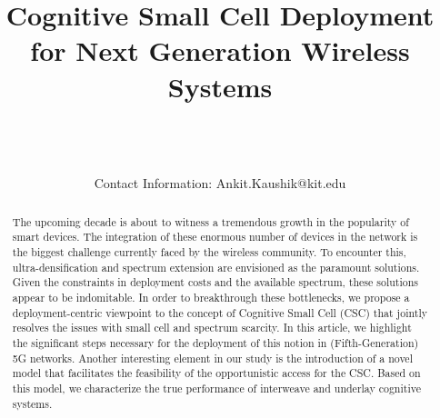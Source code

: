 \documentclass[draftcls, onecolumn, 11pt]{IEEEtran}
\begin{document}
%
\title{Cognitive Small Cell Deployment for Next Generation Wireless Systems}
\author{ \\
 \\ 
 \\ 
Contact Information: Ankit.Kaushik@kit.edu
}


\maketitle
\thispagestyle{empty}
\pagestyle{empty}

\begin{abstract}
The upcoming decade is about to witness a tremendous growth in the popularity of smart devices. 
The integration of these enormous number of devices in the network is the biggest challenge currently faced by the wireless community. To encounter this, ultra-densification and spectrum extension are envisioned as the paramount solutions. Given the constraints in deployment costs and the available spectrum, these solutions appear to be indomitable. In order to breakthrough these bottlenecks, we propose a deployment-centric viewpoint to the concept of Cognitive Small Cell (CSC) that jointly resolves the issues with small cell and spectrum scarcity. In this article, we highlight the significant steps necessary for the deployment of this notion in (Fifth-Generation) 5G networks. Another interesting element in our study is the introduction of a novel model that facilitates the feasibility of the opportunistic access for the CSC. Based on this model, we characterize the true performance of interweave and underlay cognitive systems. 
\end{abstract}
\end{document}
